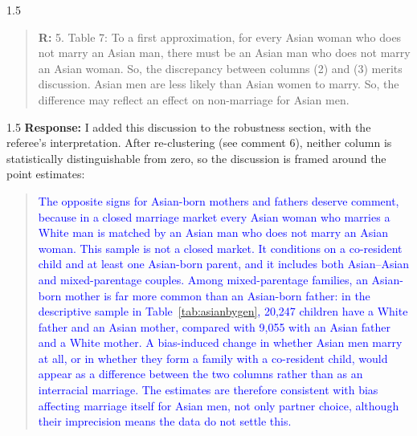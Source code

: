 \documentclass[12pt,english]{article}
\newcommand{\rrxspc}{1.5}
\begin{document}
\begin{refsection}
    \begin{spacing}{\rrxspc}
            \begin{quotation}
                \textbf{R: } 5. Table 7: To a first approximation, for every Asian woman who does not marry an Asian man, there must be an Asian man who does not marry an Asian woman. So, the discrepancy between columns (2) and (3) merits discussion. Asian men are less likely than Asian women to marry. So, the difference may reflect an effect on non-marriage for Asian men.
            \end{quotation}
    \end{spacing}
    \begin{spacing}{\rrxspc}
        \textbf{Response:} I added this discussion to the robustness section, with the referee's interpretation. After re-clustering (see comment 6), neither column is statistically distinguishable from zero, so the discussion is framed around the point estimates:
        \begin{quote}\textcolor{blue}{The opposite signs for Asian-born mothers and fathers deserve comment, because in a closed marriage market every Asian woman who marries a White man is matched by an Asian man who does not marry an Asian woman. This sample is not a closed market. It conditions on a co-resident child and at least one Asian-born parent, and it includes both Asian--Asian and mixed-parentage couples. Among mixed-parentage families, an Asian-born mother is far more common than an Asian-born father: in the descriptive sample in Table~\ref{tab:asianbygen}, 20,247 children have a White father and an Asian mother, compared with 9,055 with an Asian father and a White mother. A bias-induced change in whether Asian men marry at all, or in whether they form a family with a co-resident child, would appear as a difference between the two columns rather than as an interracial marriage. The estimates are therefore consistent with bias affecting marriage itself for Asian men, not only partner choice, although their imprecision means the data do not settle this.}\end{quote}
    \end{spacing}


\end{refsection}
\end{document}
